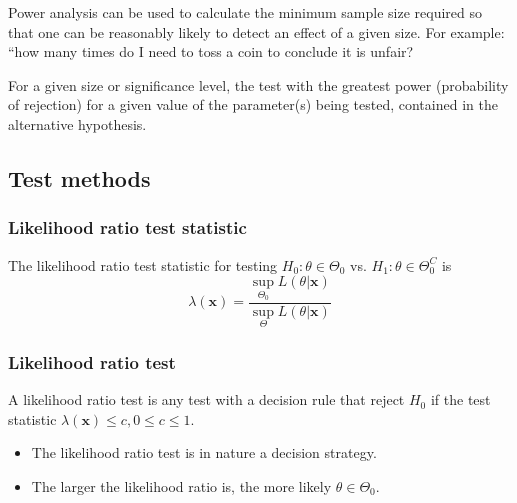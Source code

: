 \begin{refsection}
\begin{remark}
Power analysis can be used to calculate the minimum sample size required so that one can be reasonably likely to detect an effect of a given size. For example: “how many times do I need to toss a coin to conclude it is unfair?	
\end{remark}

\begin{definition}
	For a given size or significance level, the test with the greatest power (probability of rejection) for a given value of the parameter(s) being tested, contained in the alternative hypothesis.	
\end{definition}


\subsection{Test methods}
\subsubsection{Likelihood ratio test statistic}
\begin{definition}
	The likelihood ratio test statistic for testing $H_0:\theta \in \Theta_0$ vs. $H_1:\theta \in \Theta_0^C$ is
	\begin{equation}
	\lambda(\bm{x}) = \frac{\sup_{\Theta_0} L(\theta|\bm{x})}{\sup_{\Theta} L(\theta|\bm{x})}
	\end{equation}
\end{definition}


\subsubsection{Likelihood ratio test}
\begin{definition}
	A likelihood ratio test is any test with a decision rule that reject $H_0$ if the test statistic $\lambda(\bm{x}) \leq c, 0\leq c \leq 1$.
\end{definition}



\begin{remark}\hfill
	\begin{itemize}
		\item The likelihood ratio test is in nature a decision strategy.
		\item 
		The larger the likelihood ratio is, the more likely $\theta \in \Theta_0$.\\
		

\end{itemize}
\end{remark}
\end{refsection}
